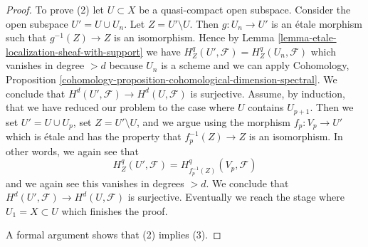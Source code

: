 \documentclass[10pt,a4paper]{amsart}
\theoremstyle{plain}
\theoremstyle{definition}
\theoremstyle{remark}
\numberwithin{equation}{subsection}
\begin{document}
\begin{proof}
\medskip\noindent
To prove (2) let $U \subset X$ be a quasi-compact open subspace.
Consider the open subspace $U' = U \cup U_n$. Let $Z = U' \setminus U$.
Then $g : U_n \to U'$ is an \'etale morphism such that
$g^{-1}(Z) \to Z$ is an isomorphism. Hence by
Lemma \ref{lemma-etale-localization-sheaf-with-support}
we have $H^q_Z(U', \mathcal{F}) = H^q_Z(U_n, \mathcal{F})$
which vanishes in degree $> d$ because $U_n$ is a scheme
and we can apply
Cohomology, Proposition
\ref{cohomology-proposition-cohomological-dimension-spectral}.
We conclude that $H^d(U', \mathcal{F}) \to H^d(U, \mathcal{F})$
is surjective. Assume, by induction, that we have reduced
our problem to the case where $U$ contains $U_{p + 1}$.
Then we set $U' = U \cup U_p$, set $Z = U' \setminus U$, and
we argue using the morphism $f_p : V_p \to U'$ which is \'etale
and has the property that $f_p^{-1}(Z) \to Z$ is an isomorphism.
In other words, we again see that
$$
H^q_Z(U', \mathcal{F}) = H^q_{f_p^{-1}(Z)}(V_p, \mathcal{F})
$$
and we again see this vanishes in degrees $> d$.
We conclude that $H^d(U', \mathcal{F}) \to H^d(U, \mathcal{F})$
is surjective. Eventually we reach the stage where $U_1 = X \subset U$
which finishes the proof.

\medskip\noindent
A formal argument shows that (2) implies (3).
\end{proof}
\end{document}
